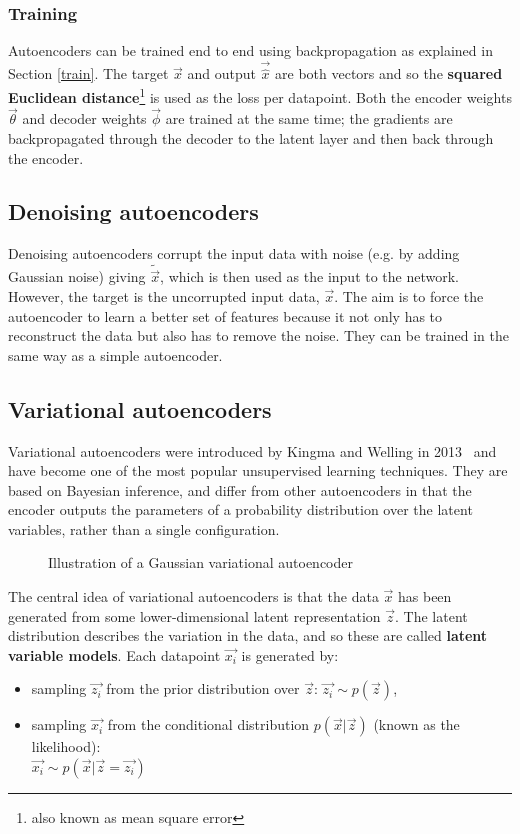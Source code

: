 \subsubsection{Training}
Autoencoders can be trained end to end using backpropagation as explained in Section \ref{train}. The target $\vec{x}$ and output 
$\vec{\hat{x}}$ are both vectors and so 
the \textbf{squared Euclidean distance}\footnote{also known as mean square error} is used as the loss per datapoint. Both the encoder weights 
$\vec{\theta}$ and 
decoder weights $\vec{\phi}$ 
are trained at the 
same time; the gradients are backpropagated through the decoder to the latent layer and then back through the encoder. 

\subsection{Denoising autoencoders}

Denoising autoencoders corrupt the input data with noise (e.g. by adding Gaussian noise) giving $\tilde{\vec{x}}$, which is then used as the 
input to the network. However, the target is the uncorrupted input data, 
$\vec{x}$. The aim is to force the autoencoder to learn a better set of features because it not only has to reconstruct the data but also 
has to remove the noise. They can be trained in the same way as a simple autoencoder.

\subsection{Variational autoencoders} \label{vae}

Variational autoencoders were 
introduced by Kingma and Welling in 2013~\cite{DBLP:journals/corr/KingmaW13} and have become one of the most popular unsupervised learning techniques. 
They are based on Bayesian inference, and differ from other autoencoders in that the encoder outputs
the parameters of a probability distribution over the latent variables, rather than a single configuration.
\begin{figure}[H]
  \begin{center}
      \scalebox{.75}{}
      \caption{Illustration of a Gaussian variational autoencoder}
      \label{fig:gauss_vae}
  \end{center}
\end{figure}

The central idea of variational autoencoders is that the data $\vec{x}$ has been generated from some lower-dimensional latent
representation $\vec{z}$. The latent distribution describes the variation in the data, and so these are called 
\textbf{latent variable models}. Each datapoint $\vec{x_{i}}$ is generated by:
\begin{itemize}
  \item sampling $\vec{z_{i}}$ from the prior distribution over $\vec{z}$: $\vec{z_{i}} \sim p(\vec{z})$, 
  \item sampling $\vec{x_{i}}$ from the conditional distribution $p(\vec{x}|\vec{z})$ (known as the likelihood): \\ 
  $\vec{x_{i}} \sim p(\vec{x}|\vec{z}=\vec{z_{i}})$
\end{itemize}

